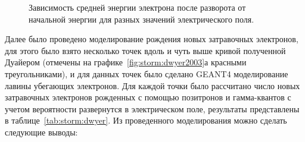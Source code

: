 \begin{figure}[ph!]
    \begin{center}
        \begin{minipage}[h]{0.49\linewidth}
        \end{minipage}
        \hfill
        \begin{minipage}[h]{0.49\linewidth}
        \end{minipage}    
        \vfill
        \begin{minipage}[h]{0.49\linewidth}
        \end{minipage}
        \hfill
        \begin{minipage}[h]{0.49\linewidth}
        \end{minipage} 
        \vfill
        \begin{minipage}[h]{0.49\linewidth}
        \end{minipage}
        \caption{Зависимость средней энергии электрона после разворота от начальной энергии для разных значений электрического поля.}
    \end{center}
    \label{fig:storm:reverse_energy_nc_2}
\end{figure}
Далее было проведено моделирование рождения новых затравочных электронов, для этого было взято несколько точек вдоль и чуть выше кривой полученной Дуайером (отмечены на графике~\ref{fig:storm:dwyer2003}а красными треугольниками), и для данных точек было сделано GEANT4 моделирование лавины убегающих электронов.  Для каждой точки было рассчитано число новых затравочных электронов рожденных с помощью позитронов и гамма-квантов с учетом вероятности развернутся в электрическом поле, результаты представлены в таблице~\ref{tab:storm:dwyer}. Из проведенного моделирования можно сделать следующие выводы:
